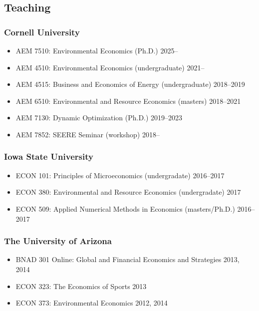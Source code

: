 \documentclass[11pt]{res} %
\begin{document}
\begin{resume}
\subsection{Teaching}\vspace{-.2in}
\subsubsection{Cornell University}
\begin{itemize} \itemsep -1pt
	\item[] AEM 7510: Environmental Economics (Ph.D.) \hfill 2025--
	\item[] AEM 4510: Environmental Economics (undergraduate) \hfill 2021--
	\item[] AEM 4515: Business and Economics of Energy (undergraduate) \hfill 2018--2019
	\item[] AEM 6510: Environmental and Resource Economics (masters) \hfill 2018--2021
	\item[] AEM 7130: Dynamic Optimization (Ph.D.) \hfill 2019--2023
	\item[] AEM 7852: SEERE Seminar (workshop) \hfill 2018--
\end{itemize}\vspace{-.3in}
\subsubsection{Iowa State University}
\begin{itemize} \itemsep -1pt
	\item[] ECON 101: Principles of Microeconomics (undergradate) \hfill 2016--2017
	\item[] ECON 380: Environmental and Resource Economics (undergradate) \hfill 2017
	\item[] ECON 509: Applied Numerical Methods in Economics (masters/Ph.D.) \hfill 2016--2017
\end{itemize}\vspace{-.3in}
\subsubsection{The University of Arizona}
\begin{itemize} \itemsep -1pt %
	\item[] BNAD 301 Online: Global and Financial Economics and Strategies \hfill 2013, 2014
	\item[] ECON 323: The Economics of Sports \hfill 2013
	\item[] ECON 373: Environmental Economics \hfill 2012, 2014
\end{itemize}


\end{resume}
\end{document}
